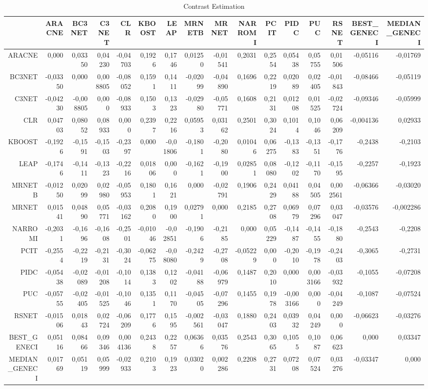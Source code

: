 \documentclass[a4paper,10pt]{article}
\begin{document}
\begin{landscape}
\newpage

\begin{table}[!htp]
\centering\tiny
\caption{Contrast Estimation}
\begin{tabular}{
|r|r|r|r|r|r|r|r|r|r|r|r|r|r|r|r|}
\hline
 &ARACNE&BC3NET&C3NET&CLR&KBOOST&LEAP&MRNETB&MRNET&NARROMI&PCIT&PIDC&PUC&RSNET&BEST_GENECI&MEDIAN_GENECI\\
\hline
ARACNE&0,000&0,03350&0,04230&-0,04703&0,1926&0,1746&0,01250&-0,01541&0,2031&0,2554&0,05438&0,05755&0,01506&-0,05116&-0,01769\\
\hline
BC3NET&-0,03350&0,000&0,008805&-0,08052&0,1591&0,1411&-0,02099&-0,04890&0,1696&0,2219&0,02089&0,02405&-0,01843&-0,08466&-0,05119\\
\hline
C3NET&-0,04230&-0,008805&0,000&-0,08933&0,1503&0,1323&-0,02980&-0,05771&0,1608&0,2131&0,01208&0,01525&-0,02724&-0,09346&-0,05999\\
\hline
CLR&0,04703&0,08052&0,08933&0,000&0,2397&0,2216&0,05953&0,03162&0,2501&0,3024&0,1014&0,1046&0,06209&-0,004136&0,02933\\
\hline
KBOOST&-0,1926&-0,1591&-0,1503&-0,2397&0,000&-0,01806&-0,1801&-0,2080&0,01046&0,06275&-0,1383&-0,1351&-0,1776&-0,2438&-0,2103\\
\hline
LEAP&-0,1746&-0,1411&-0,1323&-0,2216&0,01806&0,000&-0,1621&-0,1900&0,02851&0,08080&-0,1202&-0,1170&-0,1595&-0,2257&-0,1923\\
\hline
MRNETB&-0,01250&0,02099&0,02980&-0,05953&0,1801&0,1621&0,000&-0,02791&0,1906&0,2429&0,04188&0,04505&0,002561&-0,06366&-0,03020\\
\hline
MRNET&0,01541&0,04890&0,05771&-0,03162&0,2080&0,1900&0,02791&0,000&0,2185&0,2708&0,06979&0,07296&0,03047&-0,03576&-0,002286\\
\hline
NARROMI&-0,2031&-0,1696&-0,1608&-0,2501&-0,01046&-0,02851&-0,1906&-0,2185&0,000&0,05229&-0,1487&-0,1455&-0,1880&-0,2543&-0,2208\\
\hline
PCIT&-0,2554&-0,2219&-0,2131&-0,3024&-0,06275&-0,08080&-0,2429&-0,2708&-0,05229&0,000&-0,2010&-0,1978&-0,2403&-0,3065&-0,2731\\
\hline
PIDC&-0,05438&-0,02089&-0,01208&-0,1014&0,1383&0,1202&-0,04188&-0,06979&0,1487&0,2010&0,000&0,003166&-0,03932&-0,1055&-0,07208\\
\hline
PUC&-0,05755&-0,02405&-0,01525&-0,1046&0,1351&0,1170&-0,04505&-0,07296&0,1455&0,1978&-0,003166&0,000&-0,04249&-0,1087&-0,07524\\
\hline
RSNET&-0,01506&0,01843&0,02724&-0,06209&0,1776&0,1595&-0,002561&-0,03047&0,1880&0,2403&0,03932&0,04249&0,000&-0,06623&-0,03276\\
\hline
BEST_GENECI&0,05116&0,08466&0,09346&0,004136&0,2438&0,2257&0,06366&0,03576&0,2543&0,3065&0,1055&0,1087&0,06623&0,000&0,03347\\
\hline
MEDIAN_GENECI&0,01769&0,05119&0,05999&-0,02933&0,2103&0,1923&0,03020&0,002286&0,2208&0,2731&0,07208&0,07524&0,03276&-0,03347&0,000\\
\hline


\end{tabular}
\end{table}
\end{landscape}
\end{document}
